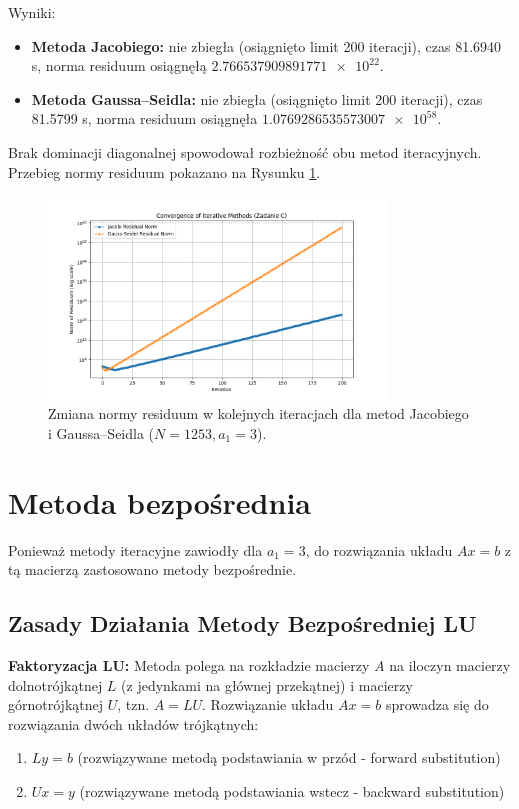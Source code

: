 \documentclass[a4paper, 11pt]{article}
\begin{document}
Wyniki:
\begin{itemize}
    \item \textbf{Metoda Jacobiego:} nie zbiegła (osiągnięto limit 200 iteracji), czas \num{81.6940} s, norma residuum osiągnęłą $\num{2.766537909891771e+22}$.
    \item \textbf{Metoda Gaussa–Seidla:} nie zbiegła (osiągnięto limit 200 iteracji), czas \num{81.5799} s, norma residuum osiągnęła $\num{1.0769286535573007e+58}$.
\end{itemize}
Brak dominacji diagonalnej spowodował rozbieżność obu metod iteracyjnych. Przebieg normy residuum pokazano na Rysunku \ref{fig:task_c_convergence}.

\begin{figure}[H]
    \centering
    \includegraphics[width=0.8\textwidth]{residuals_plot_C}
    \caption{Zmiana normy residuum w kolejnych iteracjach dla metod Jacobiego i Gaussa–Seidla ($N=1253, a_1=3$).}
    \label{fig:task_c_convergence}
\end{figure}

\section{Metoda bezpośrednia}
Ponieważ metody iteracyjne zawiodły dla $a_1=3$, do rozwiązania układu $Ax=b$ z tą macierzą zastosowano metody bezpośrednie.

\subsection{Zasady Działania Metody Bezpośredniej LU}

\textbf{Faktoryzacja LU:} Metoda polega na rozkładzie macierzy $A$ na iloczyn macierzy dolnotrójkątnej $L$ (z jedynkami na głównej przekątnej) i macierzy górnotrójkątnej $U$, tzn. $A = LU$. Rozwiązanie układu $Ax=b$ sprowadza się do rozwiązania dwóch układów trójkątnych:
\begin{enumerate}
    \item $Ly = b$ (rozwiązywane metodą podstawiania w przód - forward substitution)
    \item $Ux = y$ (rozwiązywane metodą podstawiania wstecz - backward substitution)
\end{enumerate}
\end{document}
